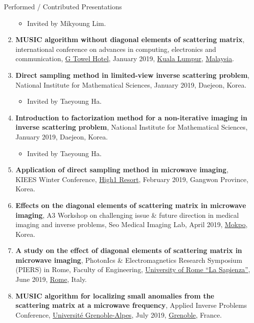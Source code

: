 \documentclass{resume} %
\begin{document}
\begin{rSection}{Performed / Contributed Presentations}
\begin{enumerate}
\begin{itemize}
\item Invited by Mikyoung Lim.
\end{itemize}
\item\label{P-ACEC2019} \textbf{MUSIC algorithm without diagonal elements of scattering matrix},  international conference on advances in computing, electronics and communication, \href{http://www.gtowerhotel.com/}{G Towel Hotel}, January 2019, \href{http://www.kuala-lumpur.ws}{Kuala Lumpur}, \href{https://www.lonelyplanet.com/malaysia}{Malaysia}.
\item\label{P-NIMS2019A} \textbf{Direct sampling method in limited-view inverse scattering problem}, National Institute for Mathematical Sciences, January 2019, Daejeon, Korea.
    \begin{itemize}
\item Invited by Taeyoung Ha.
\end{itemize}
\item\label{P-NIMS2019B} \textbf{Introduction to factorization method for a non-iterative imaging in inverse scattering problem}, National Institute for Mathematical Sciences, January 2019, Daejeon, Korea.
    \begin{itemize}
\item Invited by Taeyoung Ha.
\end{itemize}
\item\label{P-KIEES2019A} \textbf{Application of direct sampling method in microwave imaging}, KIEES Winter Conference, \href{http://www.high1.com/eng/Hhome/main.high1}{High1 Resort}, February 2019, Gangwon Province, Korea.
\item\label{P-A32019} \textbf{Effects on the diagonal elements of scattering matrix in microwave imaging}, A3 Workshop on challenging issue \& future direction in medical imaging and inverse problems, Seo Medical Imaging Lab, April 2019, \href{http://www.mokpo.go.kr/eng}{Mokpo}, Korea.
\item\label{P-PIERS2019A} \textbf{A study on the effect of diagonal elements of scattering matrix in microwave imaging}, PhotonIcs \& Electromagnetics Research Symposium (PIERS) in Rome, Faculty of Engineering, \href{https://www.uniroma1.it/en}{University of Rome ``La Sapienza''}, June 2019, \href{https://www.comune.roma.it/web/it/welcome.page}{Rome}, Italy.
\item\label{P-AIP2019} \textbf{MUSIC algorithm for localizing small anomalies from the scattering matrix at a microwave frequency},  Applied Inverse Problems Conference, \href{https://www.univ-grenoble-alpes.fr/le-campus-de-saint-martin-d-heres/le-campus-de-saint-martin-d-heres-369727.kjsp}{Universit\'e Grenoble-Alpes}, July 2019, \href{https://www.grenoble.fr}{Grenoble}, France.

\end{enumerate}
\end{rSection}
\end{document}

